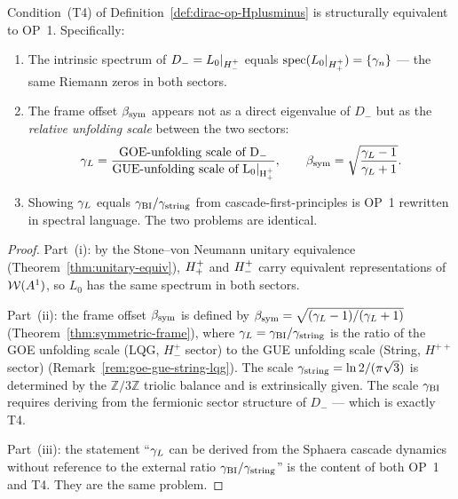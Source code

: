 \begin{theorem}[OP~2 (T4) = OP~1: $\bsym$ as spectral scale ratio]
\label{thm:op2-T4-equals-op1}
Condition~(T4) of Definition~\ref{def:dirac-op-Hplusminus} is
structurally equivalent to OP~1. Specifically:
\begin{enumerate}[label=(\roman*)]
 \item The intrinsic spectrum of $D_{-} = L_0|_{H^+_-}$ equals
 $\mathrm{spec}(L_0|_{H^+_+}) = \{\gamma_n\}$ --- the same
 Riemann zeros in both sectors.
 \item The frame offset $\bsym$ appears not as a direct eigenvalue
 of $D_{-}$ but as the \emph{relative unfolding scale} between
 the two sectors:
 \[
 \gamma_L = \frac{\mathrm{GOE\text{-}unfolding\text{ scale of }D_{-}}}
 {\mathrm{GUE\text{-}unfolding\text{ scale of }L_0|_{H^+_+}}},
 \qquad
 \beta_{\mathrm{sym}} = \sqrt{\frac{\gamma_L-1}{\gamma_L+1}}.
 \]
 \item Showing $\gamma_L$ equals $\gamma_{\mathrm{BI}}/\gamma_{\mathrm{string}}$ from cascade-first-principles
 is OP~1 rewritten in spectral language. The two problems are identical.
\end{enumerate}
\end{theorem}

\begin{proof}
Part~(i): by the Stone--von Neumann unitary equivalence
(Theorem~\ref{thm:unitary-equiv}), $H^+_+$ and $H^+_-$ carry
equivalent representations of $\mathcal{W}(A^1)$, so $L_0$ has the same spectrum in
both sectors.

Part~(ii): the frame offset $\bsym$ is defined by
$\beta_{\mathrm{sym}}=\sqrt{(\gamma_L-1)/(\gamma_L+1)}$ (Theorem~\ref{thm:symmetric-frame}),
where $\gamma_L=\gamma_{\mathrm{BI}}/\gamma_{\mathrm{string}}$ is the ratio of the GOE unfolding scale
(LQG, $H^+_-$ sector) to the GUE unfolding scale (String, $H^{++}$ sector)
(Remark~\ref{rem:goe-gue-string-lqg}).
The scale $\gamma_{\mathrm{string}} = \ln 2/(\pi\sqrt{3})$ is determined by the
$\mathbb{Z}/3\mathbb{Z}$ triolic balance and is extrinsically given.
The scale $\gamma_{\mathrm{BI}}$ requires deriving from the fermionic sector structure
of $D_{-}$ --- which is exactly T4.

Part~(iii): the statement ``$\gamma_L$ can be derived from the Sphaera
cascade dynamics without reference to the external ratio
$\gamma_{\mathrm{BI}}/\gamma_{\mathrm{string}}$'' is the content of both OP~1 and T4.
They are the same problem.
\end{proof}

